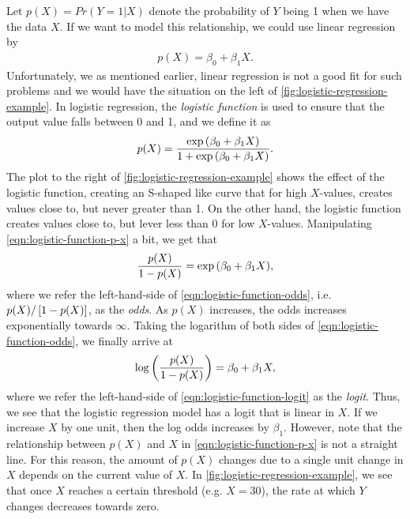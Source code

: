 Let $p(X) = Pr(Y = 1|X)$ denote the probability of $Y$ being 1 when we have the data $X$. If we want to model this relationship, we could use linear regression by
\begin{align}
    p(X) = \beta_0 + \beta_1 X.
\end{align}
Unfortunately, we as mentioned earlier, linear regression is not a good fit for such problems and we would have the situation on the left of \cref{fig:logistic-regression-example}. In logistic regression, the \textit{logistic function} is used to ensure that the output value falls between 0 and 1, and we define it as
\begin{align}
    p(X) = \frac{\exp{\left(\beta_0 + \beta_1 X\right)}}{1 + \exp{\left(\beta_0 + \beta_1 X\right)}}.
    \label{eqn:logistic-function-p-x}
\end{align}
The plot to the right of \cref{fig:logistic-regression-example} shows the effect of the logistic function, creating an S-shaped like curve that for high $X$-values, creates values close to, but never greater than 1. On the other hand, the logistic function creates values close to, but lever less than 0 for low $X$-values. Manipulating \cref{eqn:logistic-function-p-x} a bit, we get that
\begin{align}
    \frac{p(X)}{1 - p(X)} = \exp{\left(\beta_0 + \beta_1 X\right)},
    \label{eqn:logistic-function-odds}
\end{align}
where we refer the left-hand-side of \cref{eqn:logistic-function-odds}, i.e. $p(X)/\left[1 - p(X)\right]$, as the \textit{odds}. As $p(X)$ increases, the odds increases exponentially towards $\infty$. Taking the logarithm of both sides of \cref{eqn:logistic-function-odds}, we finally arrive at
\begin{align}
    \log \left(\frac{p(X)}{1 - p(X)}\right) = \beta_0 + \beta_1 X,
    \label{eqn:logistic-function-logit}
\end{align}
where we refer the left-hand-side of \cref{eqn:logistic-function-logit} as the \textit{logit}. Thus, we see that the logistic regression model has a logit that is linear in $X$. If we increase $X$ by one unit, then the log odds increases by $\beta_1$. However, note that the relationship between $p(X)$ and $X$ in \cref{eqn:logistic-function-p-x} is not a straight line. For this reason, the amount of $p(X)$ changes due to a single unit change in $X$ depends on the current value of $X$. In \cref{fig:logistic-regression-example}, we see that once $X$ reaches a certain threshold (e.g. $X=30$), the rate at which $Y$ changes decreases towards zero.

